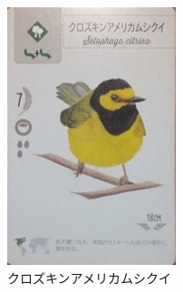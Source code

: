\begin{figure}[h]
\begin{minipage}[b]{0.23\columnwidth}
    \includegraphics[width=0.9\columnwidth]{2025shinki/wing_span/kurozukinnamerikamusikui.jpg}
    \caption{クロズキンアメリカムシクイ}
    \label{fig:クロズキンアメリカムシクイ}
\end{minipage}
\begin{minipage}[b]{0.23\columnwidth}
    \centering

\end{minipage}
\end{figure}
